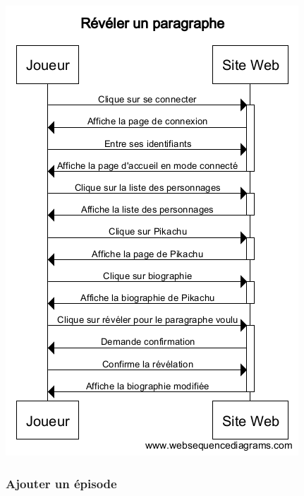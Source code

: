 \documentclass[a4paper, 11pt, titlepage]{article}
\begin{document}
\begin{center}
\includegraphics[scale=0.7]{sequence/RevelerParagAnalyse.png}
\end{center}

\subsubsection{Ajouter un épisode}
\end{document}
